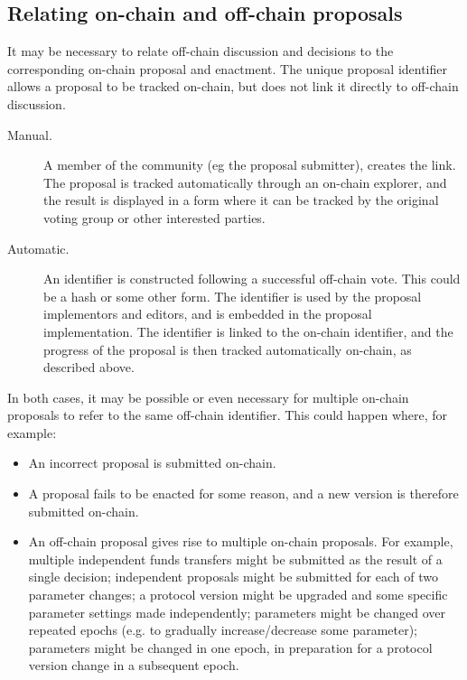 \subsection{Relating on-chain and off-chain proposals}
\label{sect:relating-off-and-on-chain}

It may be necessary to relate off-chain discussion and decisions to the corresponding on-chain proposal and enactment.  The unique proposal
identifier allows a proposal to be tracked on-chain, but does not link it directly to off-chain discussion.

\begin{description}
\item [Manual.]
  A member of the community (eg the proposal submitter), creates the link.  The proposal is tracked automatically through an on-chain explorer, and the result is
  displayed in a form where it can be tracked by the original voting group or other interested parties.
\item [Automatic.]
  An identifier is constructed following a successful off-chain vote.  This could be a hash or some other form.  The identifier is used by the proposal implementors and editors, and is embedded
  in the proposal implementation.  The identifier is linked to the on-chain identifier, and the progress of the proposal is then tracked automatically on-chain, as described above.
\end{description}

In both cases, it may be possible or even necessary for multiple on-chain proposals to refer to the same off-chain identifier.  This could happen where, for example:

\begin{itemize}
\item
  An incorrect proposal is submitted on-chain.
\item
  A proposal fails to be enacted for some reason, and a new version is therefore submitted on-chain.
\item
  An off-chain proposal gives rise to multiple on-chain proposals.  For example, multiple independent funds transfers might be submitted as the result of a single
  decision; independent proposals might be submitted for each of two parameter changes; a protocol version might be upgraded and some specific parameter settings made independently;
  parameters might be changed over repeated epochs (e.g. to gradually increase/decrease some parameter); parameters might be changed in one epoch, in preparation for a protocol version
  change in a subsequent epoch.
\end{itemize}

